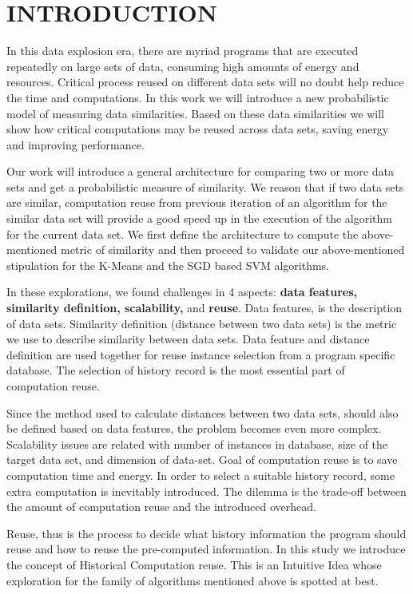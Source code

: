 \chapter{INTRODUCTION}
\label{chap-one}
In this data explosion era, there are myriad programs that are executed repeatedly on large sets of data, consuming high amounts of energy and resources. Critical process reused on different data sets will no doubt help reduce the time and computations. In this work we will introduce a new probabilistic model of measuring data similarities. Based on these data similarities we will show how critical computations may be reused across data sets, saving energy and improving performance.

Our work will introduce a general architecture for comparing two or more data sets and get a probabilistic measure of similarity. We reason that if two data sets are similar, computation reuse from previous iteration of an algorithm for the similar data set will provide a good speed up in the execution of the algorithm for the current data set.
We first define the architecture to compute the above-mentioned metric of similarity and then proceed to validate our above-mentioned stipulation for the K-Means and the SGD based SVM algorithms.

In these explorations, we found challenges in 4 aspects: \textbf{data features, similarity definition, scalability,} and \textbf{reuse}. Data features, is the description of data sets. Similarity definition (distance between two data sets) is the metric we use to describe similarity between data sets. Data feature and distance definition are used together for reuse instance selection from a program specific database. The selection of history record is the most essential part of computation reuse.

Since the method used to calculate distances between two data sets, should also be defined based on data features, the problem becomes even more complex. Scalability issues are related with number of instances in database, size of the target data set, and dimension of data-set. Goal of computation reuse is to save computation time and energy. In order to select a suitable history record, some extra computation is inevitably introduced. The dilemma is the trade-off between the amount of computation reuse and the introduced overhead. 

Reuse, thus is the process to decide what history information the program should reuse and how to reuse the pre-computed information.
In this study we introduce the concept of Historical Computation reuse. This is an Intuitive Idea whose exploration for the family of algorithms mentioned above is spotted at best.

